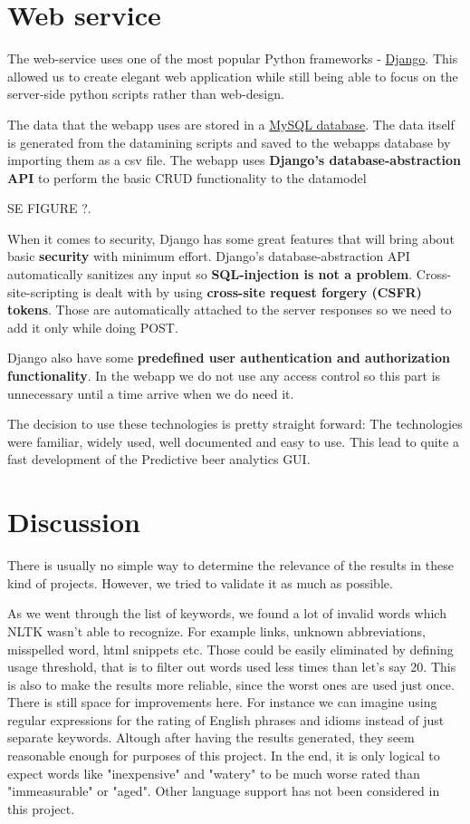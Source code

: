 \documentclass[10pt]{IEEEtran}
\begin{document}
\section{Web service}

The web-service uses one of the most popular Python frameworks - \href{https://www.djangoproject.com/}{Django}. This allowed us to create elegant web application while still being able to focus on the server-side python scripts rather than web-design.

The data that the webapp uses are stored in a \href{http://www.mysql.com/}{MySQL database}.
The data itself is generated from the datamining scripts and saved to the webapps database by importing them as a csv file.
The webapp uses \textbf{Django's database-abstraction API} to perform the basic CRUD functionality to the datamodel 

SE FIGURE ?.
 
When it comes to security, Django has some great features that will bring about basic \textbf{security} with minimum effort.
Django's database-abstraction API automatically sanitizes any input so \textbf{SQL-injection is not a problem}.
Cross-site-scripting is dealt with by using \textbf{cross-site request forgery (CSFR) tokens}. Those are automatically attached to the server responses so we need to add it only while doing POST.

Django also have some \textbf{predefined user authentication and authorization functionality}.
In the webapp we do not use any access control so this part is unnecessary until a time arrive when we do need it.

The decision to use these technologies is pretty straight forward:
The technologies were familiar, widely used, well documented and easy to use.
This lead to quite a fast development of the Predictive beer analytics GUI.



\section{Discussion}

There is usually no simple way to determine the relevance of the results in these kind of projects. However, we tried to validate it as much as possible. 

As we went through the list of keywords, we found a lot of invalid words which NLTK wasn't able to recognize. For example links, unknown abbreviations, misspelled word, html snippets etc. Those could be easily eliminated by defining usage threshold, that is to filter out words used less times than let's say 20. This is also to make the results more reliable, since the worst ones are used just once. There is still space for improvements here. For instance we can imagine using regular expressions for the rating of English phrases and idioms instead of just separate keywords. Altough after having the results generated, they seem reasonable enough for purposes of this project. In the end, it is only logical to expect words like "inexpensive" and "watery" to be much worse rated than "immeasurable" or "aged". Other language support has not been considered in this project.
\end{document}
